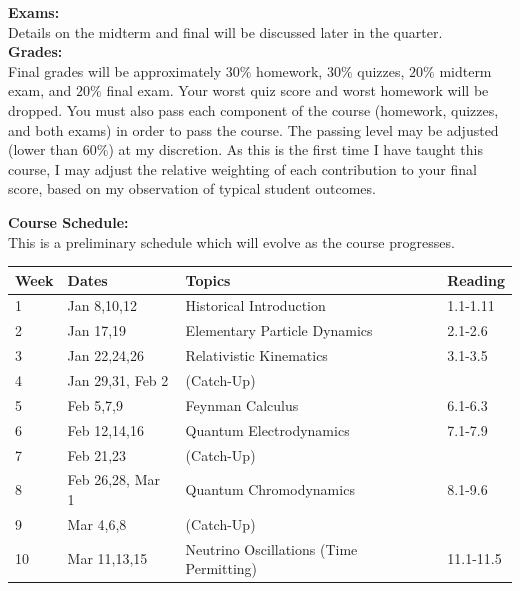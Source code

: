 \documentclass[12pt]{article}
\begin{document}
\noindent
\noindent
\textbf{Exams:}\\
Details on the midterm and final will be discussed later in the quarter.\\[3pt]

\noindent
\textbf {Grades:}\\
Final grades will be approximately $30\%$ homework, $30\%$ quizzes, $20\%$ midterm exam, 
and $20\%$ final exam. Your worst quiz score and worst homework will be dropped.  
You must also pass each component of the course (homework, quizzes, and both exams) in order to pass the course.  The passing level may be adjusted (lower than $60\%$) at my discretion. As this is the first time I have taught this course, I may adjust the relative weighting of each contribution to your final score, based on my observation of typical student outcomes.\\
\noindent


\noindent
\textbf {Course Schedule:}\\
This is a preliminary schedule which will evolve as the course progresses.\\

\noindent
\begin{tabular}{llll}
\textbf{Week} & \textbf{Dates} & \textbf{Topics} & \textbf{Reading} \\
\hline
1  & Jan 8,10,12      & Historical Introduction & 1.1-1.11    \\
\hline
2  & Jan 17,19        & Elementary Particle Dynamics & 2.1-2.6 \\
\hline
3  & Jan 22,24,26     & Relativistic Kinematics & 3.1-3.5    \\
\hline
4  & Jan 29,31, Feb 2 & (Catch-Up)    &     \\
\hline
5  & Feb 5,7,9        & Feynman Calculus  & 6.1-6.3    \\
\hline
6  & Feb 12,14,16     & Quantum Electrodynamics & 7.1-7.9     \\
\hline
7  & Feb 21,23        & (Catch-Up)    & \\
\hline
8  & Feb 26,28, Mar 1 & Quantum Chromodynamics &   8.1-9.6\\
\hline
9  & Mar 4,6,8        & (Catch-Up)   & \\
\hline
10 & Mar 11,13,15     & Neutrino Oscillations (Time Permitting) & 11.1-11.5\\
\hline
\end{tabular}\\ \vskip 1cm
\end{document}

